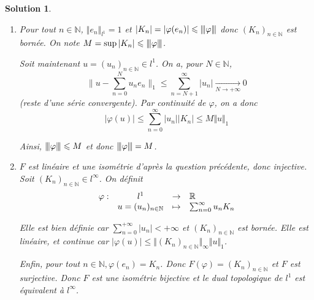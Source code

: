 \documentclass[12pt]{article}
\newtheorem{solution}{Solution}[section]
\theoremstyle{remark}
\newcommand{\N}{\mathbb{N}} \newcommand{\Z}{\mathbb{Z}}
\newcommand{\vertiii}[1]{{\left\vert\kern-0.25ex\left\vert\kern-0.25ex\left\vert{}#1
\right\vert\kern-0.25ex\right\vert\kern-0.25ex\right\vert}}
\newcommand{\function}[5]{
	$$
	\begin{array}{rccl}
		#1: & #2 & \to & #3 \\
		& #4 & \mapsto & #5
	\end{array}
	$$
}
\numberwithin{equation}{section}
\begin{document}
\begin{solution}
	\phantom{}
	\begin{enumerate}
		\item Pour tout $n\in\N$, $\Vert e_{n}\Vert_{l^{1}}=1$ et $\vert K_{n}\vert=\vert\varphi(e_{n})\vert\leqslant\vertiii{\varphi}$ donc $(K_{n})_{n\in\N}$ est bornée. On note $M=\sup\vert K_{n}\vert\leqslant\vertiii{\varphi}$.
		
		Soit maintenant $u=(u_{n})_{n\in\N}\in l^{1}$. On a, pour $N\in\N$, 
		$$\Biggl\lVert u-\sum_{n=0}^{N}u_{n}e_{n}\Biggr\rVert_{1}\leqslant\sum_{n=N+1}^{\infty}\vert u_{n}\vert\xrightarrow[N\to+\infty]{}0$$
		(reste d'une série convergente). Par continuité de $\varphi$, on a donc 
		$$\vert \varphi(u)\vert\leqslant\sum_{n=0}^{\infty}\vert u_{n}\vert \vert K_{n}\vert\leqslant M\Vert u\Vert_{1}$$

		Ainsi, $\vertiii{\varphi}\leqslant M$ et donc $\vertiii{\varphi}=M$.

		\item $F$ est linéaire et une isométrie d'après la question précédente, donc injective. Soit $(K_{n})_{n\in\N}\in l^{\infty}$. On définit \function{\varphi}{l^1}{\R}{u=(u_n)_{n\in\N}}{\sum_{n=0}^{\infty}u_{n}K_{n}}
		Elle est bien définie car $\sum_{n=0}^{+\infty}\vert u_{n}\vert<+\infty$ et $(K_{n})_{n\in\N}$ est bornée. Elle est linéaire, et continue car $\vert\varphi(u)\vert\leqslant\Vert(K_{n})_{n\in\N}\Vert_{\infty}\Vert u\Vert_{1}$.

		Enfin, pour tout $n\in\N,\varphi(e_{n})=K_{n}$. Donc $F(\varphi)=(K_{n})_{n\in\N}$ et $F$ est surjective. Donc $F$ est une isométrie bijective et le dual topologique de $l^{1}$ est équivalent à $l^{\infty}$.
	\end{enumerate}
\end{solution}
\end{document}
